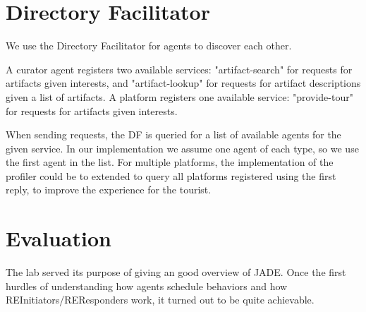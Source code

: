 \documentclass[a4paper, 11pt]{article}
\begin{document}
\section{Directory Facilitator}
We use the Directory Facilitator for agents to discover each other.

A curator agent registers two available services: "artifact-search" for requests for artifacts given interests, and "artifact-lookup" for requests for artifact descriptions given a list of artifacts. A platform registers one available service: "provide-tour" for requests for artifacts given interests.

When sending requests, the DF is queried for a list of available agents for the given service. In our implementation we assume one agent of each type, so we use the first agent in the list. For multiple platforms, the implementation of the profiler could be to extended to query all platforms registered using the first reply, to improve the experience for the tourist.

\section{Evaluation}
The lab served its purpose of giving an good overview of JADE. Once the first hurdles of understanding how agents schedule behaviors and how REInitiators/REResponders work, it turned out to be quite achievable.
\end{document}

